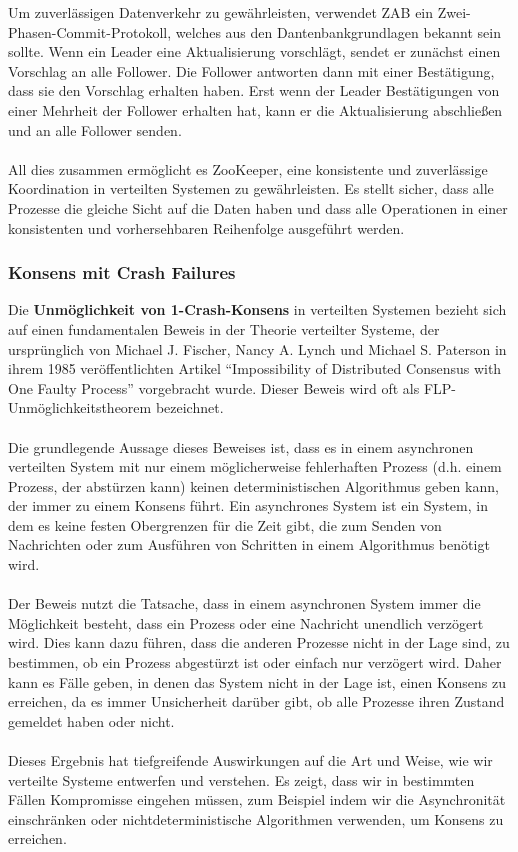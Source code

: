Um zuverlässigen Datenverkehr zu gewährleisten, verwendet ZAB ein Zwei-Phasen-Commit-Protokoll, welches aus den Dantenbankgrundlagen bekannt sein sollte. Wenn ein Leader eine Aktualisierung vorschlägt, sendet er zunächst einen Vorschlag an alle Follower. Die Follower antworten dann mit einer Bestätigung, dass sie den Vorschlag erhalten haben. Erst wenn der Leader Bestätigungen von einer Mehrheit der Follower erhalten hat, kann er die Aktualisierung abschließen und an alle Follower senden.
\\\\
All dies zusammen ermöglicht es ZooKeeper, eine konsistente und zuverlässige Koordination in verteilten Systemen zu gewährleisten. Es stellt sicher, dass alle Prozesse die gleiche Sicht auf die Daten haben und dass alle Operationen in einer konsistenten und vorhersehbaren Reihenfolge ausgeführt werden. 

\subsubsection{Konsens mit Crash Failures}
Die \textbf{Unmöglichkeit von 1-Crash-Konsens} in verteilten Systemen bezieht sich auf einen fundamentalen Beweis in der Theorie verteilter Systeme, der ursprünglich von Michael J. Fischer, Nancy A. Lynch und Michael S. Paterson in ihrem 1985 veröffentlichten Artikel \enquote{Impossibility of Distributed Consensus with One Faulty Process} vorgebracht wurde. Dieser Beweis wird oft als FLP-Unmöglichkeitstheorem bezeichnet.
\\\\
Die grundlegende Aussage dieses Beweises ist, dass es in einem asynchronen verteilten System mit nur einem möglicherweise fehlerhaften Prozess (d.h. einem Prozess, der abstürzen kann) keinen deterministischen Algorithmus geben kann, der immer zu einem Konsens führt. Ein asynchrones System ist ein System, in dem es keine festen Obergrenzen für die Zeit gibt, die zum Senden von Nachrichten oder zum Ausführen von Schritten in einem Algorithmus benötigt wird.
\\\\
Der Beweis nutzt die Tatsache, dass in einem asynchronen System immer die Möglichkeit besteht, dass ein Prozess oder eine Nachricht unendlich verzögert wird. Dies kann dazu führen, dass die anderen Prozesse nicht in der Lage sind, zu bestimmen, ob ein Prozess abgestürzt ist oder einfach nur verzögert wird. Daher kann es Fälle geben, in denen das System nicht in der Lage ist, einen Konsens zu erreichen, da es immer Unsicherheit darüber gibt, ob alle Prozesse ihren Zustand gemeldet haben oder nicht.
\\\\
Dieses Ergebnis hat tiefgreifende Auswirkungen auf die Art und Weise, wie wir verteilte Systeme entwerfen und verstehen. Es zeigt, dass wir in bestimmten Fällen Kompromisse eingehen müssen, zum Beispiel indem wir die Asynchronität einschränken oder nichtdeterministische Algorithmen verwenden, um Konsens zu erreichen.

